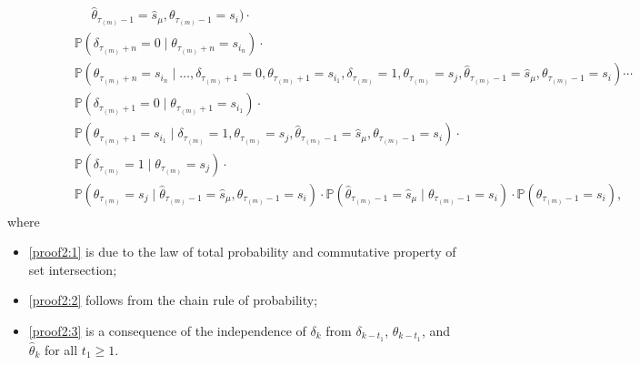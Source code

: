 \documentclass[journal,twoside,web]{ieeecolor}
\begin{document}
\begin{figure*}[ht]
\begin{align}
\begin{aligned}
& \qquad\qquad\quad\! \hat{\theta}_{\tau_{(m)}-1} = \hat{s}_{\mu},\theta_{\tau_{(m)}-1}=s_i)\cdot \\
& \qquad\quad~~~\! \mathbb{P}(\delta_{\tau_{(m)}+n}=0 \mid \theta_{\tau_{(m)}+n}=s_{i_{n}})\cdot \\
& \qquad\quad~~~\!\mathbb{P}(\theta_{\tau_{(m)}+n}=s_{i_{n}}\mid\dots,\delta_{\tau_{(m)}+1}=0,\theta_{\tau_{(m)}+1}=s_{i_{1}},\delta_{\tau_{(m)}}=1,\theta_{\tau_{(m)}}=s_j, \hat{\theta}_{\tau_{(m)}-1} = \hat{s}_{\mu},\theta_{\tau_{(m)}-1}=s_i)\cdots \\
& \qquad\quad~~~\!
\mathbb{P}(\delta_{\tau_{(m)}+1}=0 \mid \theta_{\tau_{(m)}+1}=s_{i_{1}})\cdot \\
& \qquad\quad~~~\!
\mathbb{P}(\theta_{\tau_{(m)}+1}=s_{i_{1}} \mid \delta_{\tau_{(m)}}=1,\theta_{\tau_{(m)}}=s_j, \hat{\theta}_{\tau_{(m)}-1} = \hat{s}_{\mu},\theta_{\tau_{(m)}-1}=s_i)\cdot \\
& \qquad\quad~~~\!
\mathbb{P}(\delta_{\tau_{(m)}}=1 \mid \theta_{\tau_{(m)}}=s_j)\cdot \\
& \qquad\quad~~~\!
\mathbb{P}(\theta_{\tau_{(m)}}=s_j \mid \hat{\theta}_{\tau_{(m)}-1} = \hat{s}_{\mu},\theta_{\tau_{(m)}-1}=s_i)\cdot 
\mathbb{P}(\hat{\theta}_{\tau_{(m)}-1} = \hat{s}_{\mu}\mid\theta_{\tau_{(m)}-1}=s_i) \cdot 
\mathbb{P}(\theta_{\tau_{(m)}-1}=s_i),
\end{aligned}
\end{align}
where 
\begin{itemize}
    \item \eqref{proof2:1} is due to the law of total probability and commutative property of set intersection;
    \item \eqref{proof2:2} follows from the chain rule of probability;
    \item \eqref{proof2:3} is a consequence of the independence of $\delta_{k}$ from $\delta_{k-t_{1}}$, $\theta_{k-t_{1}}$, and $\hat{\theta}_{k}$ for all $t_{1}\geq 1$.
\end{itemize}
\end{figure*}
\end{document}
